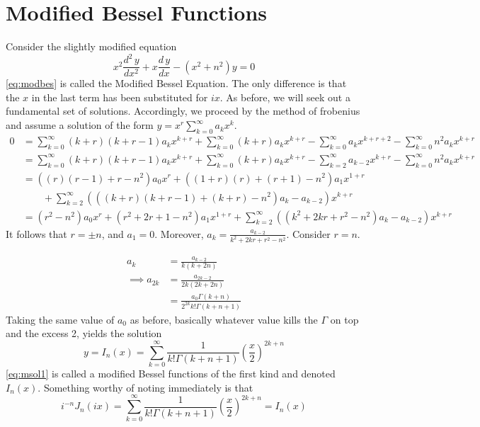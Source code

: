 \documentclass[]{article}
\begin{document}
\section{Modified Bessel Functions}
Consider the slightly modified equation 
\begin{equation} \label{eq:modbes}
	x^2 \frac{d^2 \,y }{dx^2} + x \frac{d \, y}{dx} - (x^2 + n^2)y =0
\end{equation}
\eqref{eq:modbes} is called the Modified Bessel Equation. The only difference is that the $x$ in the last term has been substituted for $ix$. As before, we will seek out a fundamental set of solutions. Accordingly, we proceed by the method of frobenius and assume a solution of the form $y = x^r \sum\limits_{k = 0}^{\infty} a_k x^k$.
\begin{align*}
	0 &= \sum_{k=0}^{\infty}(k+r)(k+r-1)a_kx^{k+r} + \sum_{k=0}^{\infty}(k+r)a_kx^{k+r} - \sum_{k=0}^{\infty}a_kx^{k+r+2} - \sum_{k=0}^{\infty}n^2a_kx^{k+r}\\
	&= \sum_{k=0}^{\infty}(k+r)(k+r-1)a_kx^{k+r} + \sum_{k=0}^{\infty}(k+r)a_kx^{k+r} - \sum_{k=2}^{\infty}a_{k-2}x^{k+r} - \sum_{k=0}^{\infty}n^2a_kx^{k+r}\\
	&= \left((r)(r-1)+r-n^2 \right)a_0x^r
	+ \left((1+r)(r)+(r+1)-n^2 \right)a_1x^{1+r} \\
	&\qquad + \sum_{k=2}^{\infty}
	\left(
	\left((k+r)(k+r-1)+(k+r)-n^2\right)a_k - a_{k-2}
	\right) x^{k+r}\\
	&= (r^2-n^2)a_0x^r + (r^2+2r+1-n^2)a_1x^{1+r} + \sum_{k=2}^{\infty} \left(
	(k^2+2kr+r^2-n^2)a_k - a_{k-2}
	\right)x^{k+r}
\end{align*}
It follows that $r = \pm n$, and $a_1 = 0$. Moreover,  $\displaystyle a_k = \frac{a_{k-2}}{k^2+2kr+r^2-n^2}$. Consider $r = n$.

\begin{align*}
	a_k &= \frac{a_{k-2}}{k(k+2n)} \\
	\implies a_{2k} &= \frac{a_{2k-2}}{2k(2k+2n)} \\
	&= \frac{a_{0}\Gamma(k+n)}{2^{2k}k!\Gamma(k+n+1)}
\end{align*}
Taking the same value of $a_0$ as before, basically whatever value kills the $\Gamma$ on top and the excess 2, yields the solution
\begin{equation} \label{eq:msol1}
	y = I_n(x) = \sum_{k=0}^{\infty} \frac{1}{k!\Gamma(k+n+1)} \left(\frac{x}{2}\right)^{2k+n}
\end{equation}
\eqref{eq:msol1} is called a modified Bessel functions of the first kind and denoted $I_n(x)$. Something worthy of noting immediately is that 
\[
	i^{-n}J_n(ix) = \sum_{k=0}^{\infty}\frac{1}{k!\Gamma(k+n+1)}\left(\frac{x}{2}\right)^{2k+n} = I_n(x)
\]
\end{document}
